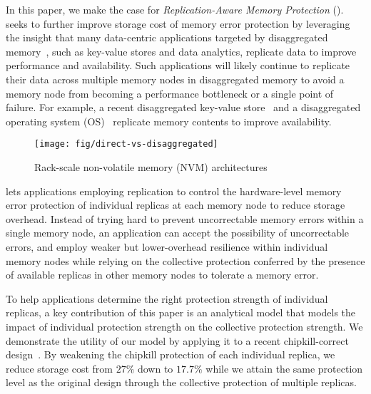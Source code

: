 In this paper, we make the case for \emph{Replication-Aware Memory Protection} (\ramp).
\ramp seeks to further improve storage cost of memory error protection by leveraging the insight that many data-centric applications targeted by disaggregated memory~\cite{pinto:thymesis:micro:2020}, such as key-value stores and data analytics, replicate data to improve performance and availability.
Such applications will likely continue to replicate their data across multiple memory nodes in disaggregated memory to avoid a memory node from becoming a performance bottleneck or a single point of failure.
For example, a recent disaggregated key-value store~\cite{tsai:dpm:atc:2020} and a disaggregated operating system (OS)~\cite{shan:legoos:osdi:2018} replicate memory contents to improve availability.

\begin{figure}[!t]
\centering
\texttt{[image: fig/direct-vs-disaggregated]}
\caption{Rack-scale non-volatile memory (NVM) architectures}
\label{fig:rack-scale-nvm}
\vspace{-0.5cm}
\end{figure}

\ramp lets applications employing replication to control the hardware-level memory error protection of individual replicas at each memory node to reduce storage overhead.
Instead of trying hard to prevent uncorrectable memory errors within a single memory node, an application can accept the possibility of uncorrectable errors, and employ weaker but lower-overhead resilience within individual memory nodes while relying on the collective protection conferred by the presence of available replicas in other memory nodes to tolerate a memory error.

To help applications determine the right protection strength of individual replicas, a key contribution of this paper is an analytical model that models the impact of individual protection strength on the collective protection strength.
We demonstrate the utility of our model by applying it to a recent chipkill-correct design~\cite{zhang:pm-chipkill:micro:2018}.
By weakening the chipkill protection of each individual replica, we reduce storage cost from $27\%$ down to $17.7\%$ while we attain the same protection level as the original design through the collective protection of multiple replicas. 